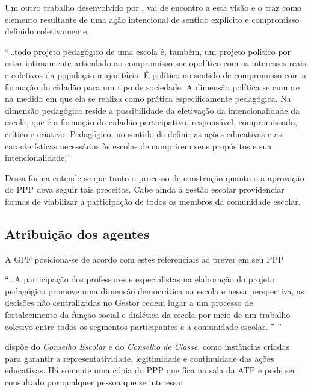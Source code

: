 Um outro trabalho desenvolvido por \cite{VEIGA:1995}, vai de encontro a esta visão e o traz como elemento resultante de uma ação intencional de sentido explícito e compromisso definido coletivamente.
\begin{citacao}
    ``\ldots todo projeto pedagógico de uma escola é, também, um projeto político por estar intimamente articulado ao compromisso sociopolítico com os interesses reais e coletivos da população majoritária. É político no sentido de compromisso com a formação do cidadão para um tipo de sociedade. A dimensão política se cumpre na medida em que ela se realiza como prática especificamente pedagógica. Na dimensão pedagógica reside a possibilidade da efetivação da intencionalidade da escola, que é a formação do cidadão participativo, responsável, compromissado, crítico e criativo. Pedagógico, no sentido de definir as ações educativas e as características necessárias às escolas de cumprirem seus propósitos e sua intencionalidade.'' 
\end{citacao}
Dessa forma entende-se que tanto o processo de construção quanto o a aprovação do PPP deva seguir tais preceitos. Cabe ainda à gestão escolar providenciar formas de viabilizar a participação de todos os membros da comunidade escolar. 

\subsection{Atribuição dos agentes}
A GPF posiciona-se de acordo com estes referenciais ao prever em seu PPP
\begin{citacao}
    ``\ldots A participação dos professores e especialistas na elaboração do projeto pedagógico promove uma dimensão democrática na escola e nessa perspectiva, as decisões não centralizadas no Gestor cedem lugar a um processo de fortalecimento da função social e dialética da escola por meio de um trabalho coletivo entre todos os segmentos participantes e a comunidade escolar. '' \cite[p. ~5]{GPTPPP:2021}''
\end{citacao}
dispõe do \emph{Conselho Escolar} e do \emph{Conselho de Classe}, como instâncias criadas para garantir a representatividade, legitimidade e continuidade das ações educativas. Há somente uma cópia do PPP que fica na sala da ATP e pode ser consultado por qualquer pessoa que se interessar.

